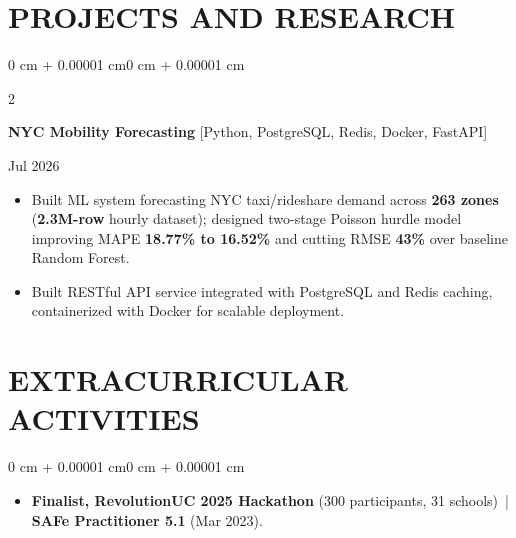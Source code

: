 \documentclass[10pt, letterpaper]{article}
\newenvironment{highlights}{
    \begin{itemize}[
        topsep=0.10 cm,
        parsep=0.06 cm,
        partopsep=0pt,
        itemsep=0.06 cm,
        leftmargin=12pt
    ]
}{
    \end{itemize}
}
\newenvironment{onecolentry}{
    \begin{adjustwidth}{0 cm + 0.00001 cm}{0 cm + 0.00001 cm}
}{
    \end{adjustwidth}
}
\newenvironment{twocolentry}[2][]{
    \onecolentry
    \def\secondColumn{#2}
    \setcolumnwidth{\fill, 4.5 cm}
    \begin{paracol}{2}
}{
    \switchcolumn \raggedleft \secondColumn
    \end{paracol}
    \endonecolentry
}
\begin{document}
\section{PROJECTS AND RESEARCH}
\begin{twocolentry}{Jul 2026}
\textbf{NYC Mobility Forecasting} [Python, PostgreSQL, Redis, Docker, FastAPI]
\end{twocolentry}
\begin{highlights}
  \item Built ML system forecasting NYC taxi/rideshare demand across \textbf{263 zones} (\textbf{2.3M-row} hourly dataset); designed two-stage Poisson hurdle model improving MAPE \textbf{18.77\% to 16.52\%} and cutting RMSE \textbf{43\%} over baseline Random Forest.
  \item Built RESTful API service integrated with PostgreSQL and Redis caching, containerized with Docker for scalable deployment.
\end{highlights}

\section{EXTRACURRICULAR ACTIVITIES}
\begin{onecolentry}
\begin{highlights}
  \item \textbf{Finalist, RevolutionUC 2025 Hackathon} (300 participants, 31 schools) \,|\, \textbf{SAFe Practitioner 5.1} (Mar 2023).
\end{highlights}
\end{onecolentry}
\end{document}
